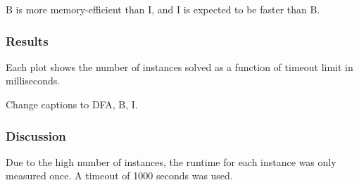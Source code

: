 \documentclass[a4paper,11pt]{article}
\newcommand{\Todo}[1]{{\color{blue}#1}}
\newcommand{\CTpaper}[0]{DBLP:conf/cp/DemeulenaereHLP16}
\numberwithin{equation}{section}
\begin{document}
B is more memory-efficient than I, and I is expected to be faster than B.

\subsubsection{Results}
Each plot shows the number of instances solved as a function
of timeout limit in milliseconds.

\Todo{Change captions to DFA, B, I.}

%

\subsubsection{Discussion}








Due to the high number of instances, the runtime for
each instance was only measured once. A timeout of 1000 seconds was used.

%








\end{document}
